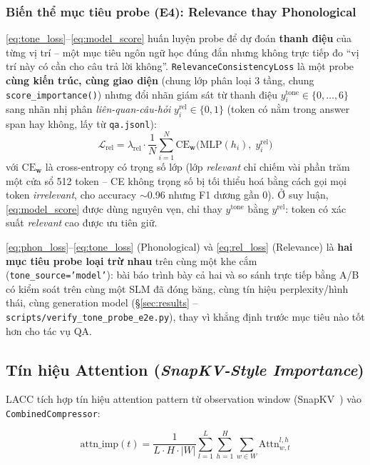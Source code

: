 \documentclass[12pt,a4paper]{article}
\newcommand{\method}[1]{\textsc{#1}}         %
\begin{document}
\subsubsection{Biến thể mục tiêu probe (E4): Relevance thay Phonological}

\eqref{eq:tone_loss}--\eqref{eq:model_score} huấn luyện probe để dự đoán \textbf{thanh điệu} của từng vị trí -- một mục tiêu ngôn ngữ học đúng đắn nhưng không trực tiếp đo ``vị trí này có cần cho câu trả lời không''. \texttt{RelevanceConsistencyLoss} là một probe \textbf{cùng kiến trúc, cùng giao diện} (chung lớp phân loại 3 tầng, chung \texttt{score\_importance()}) nhưng đổi nhãn giám sát từ thanh điệu $y_i^{\text{tone}} \in \{0,\ldots,6\}$ sang nhãn nhị phân \textit{liên-quan-câu-hỏi} $y_i^{\text{rel}} \in \{0,1\}$ (token có nằm trong answer span hay không, lấy từ \texttt{qa.jsonl}):
\begin{equation}\label{eq:rel_loss}
    \mathcal{L}_{\text{rel}} = \lambda_{\text{rel}} \cdot \frac{1}{N} \sum_{i=1}^{N} \text{CE}_{\mathbf{w}}\big(\text{MLP}(h_i),\; y_i^{\text{rel}}\big)
\end{equation}
với $\text{CE}_{\mathbf{w}}$ là cross-entropy có trọng số lớp (lớp \textit{relevant} chỉ chiếm vài phần trăm một cửa sổ 512 token -- CE không trọng số bị tối thiểu hoá bằng cách gọi mọi token \textit{irrelevant}, cho accuracy $\sim$0.96 nhưng F1 dương gần 0). Ở suy luận, \eqref{eq:model_score} được dùng nguyên vẹn, chỉ thay $y^{\text{tone}}$ bằng $y^{\text{rel}}$: token có xác suất \textit{relevant} cao được ưu tiên giữ.

\eqref{eq:phon_loss}--\eqref{eq:tone_loss} (Phonological) và \eqref{eq:rel_loss} (Relevance) là \textbf{hai mục tiêu probe loại trừ nhau} trên cùng một khe cắm (\texttt{tone\_source='model'}): bài báo trình bày cả hai và so sánh trực tiếp bằng A/B có kiểm soát trên cùng một SLM đã đóng băng, cùng tín hiệu perplexity/hình thái, cùng generation model (\S\ref{sec:results} -- \texttt{scripts/verify\_tone\_probe\_e2e.py}), thay vì khẳng định trước mục tiêu nào tốt hơn cho tác vụ QA.

\subsection{Tín hiệu Attention (\textit{SnapKV-Style Importance})}

\method{LACC} tích hợp tín hiệu attention pattern từ observation window (SnapKV~\cite{li2024snapkv}) vào \texttt{CombinedCompressor}:

\begin{equation}\label{eq:attention_importance}
    \text{attn\_imp}(t) = \frac{1}{L \cdot H \cdot |W|} \sum_{l=1}^{L} \sum_{h=1}^{H} \sum_{w \in W} \text{Attn}^{l,h}_{w, t}
\end{equation}
\end{document}
